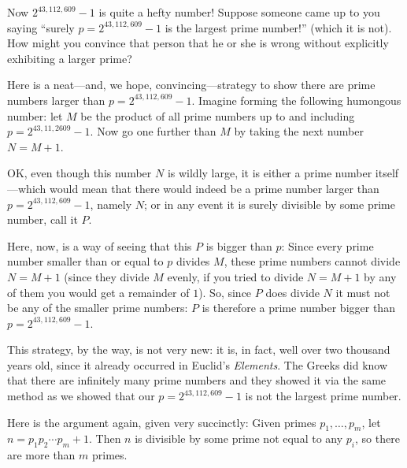 \documentclass[openany]{book}
\theoremstyle{plain}
\theoremstyle{definition}
\begin{document}
Now $2^{43,112,609}-1$ is quite a hefty number! Suppose someone came
up to you saying ``surely $p = 2^{43,112,609}-1$ is the largest prime
number!'' (which it is not). How might you convince that person that
he or she is wrong without explicitly exhibiting a larger prime?


Here is a neat---and, we hope, convincing---strategy to show there are
prime numbers larger than $p = 2^{43,112,609} - 1$. Imagine
forming the following humongous number: let $M$ be the product of all
prime numbers up to and including $p = 2^{43,11,2609} - 1$.  Now go
one further than $M$ by taking the next number $N=M+1$.


OK, even though this number $N$ is wildly large, it is either a prime
number itself---which would mean that there would indeed be a prime
number larger than $p=2^{43,112,609} - 1$, namely $N$; or in any event it is
surely divisible by some prime number, call it $P$.

Here, now, is a way of seeing that this $P$ is bigger than $p$: Since
every prime number smaller than or equal to $p$ divides $M$, these
prime numbers cannot divide $N= M+1$ (since they divide $M$ evenly, if
you tried to divide $N=M+1$ by any of them you would get a remainder
of $1$).  So, since $P$ does divide $N$ it must not be any of the
smaller prime numbers: $P$ is therefore a prime number bigger than $p=
2^{43,112,609}-1$.

This strategy, by the way, is not very new: it is, in fact, well over
two thousand years old, since it already occurred in Euclid's {\em
  Elements}. The Greeks did know that there are infinitely many prime
numbers and they showed it via the same method as we showed that our
$p = 2^{43,112,609} - 1$ is not the largest prime number.

Here is the argument again, given very succinctly:
Given primes $p_1, \ldots, p_m$, let $n=p_1 p_2 \cdots p_m +
1$.  Then $n$ is divisible by some prime not equal to any $p_i$,
so there are more than $m$ primes.
\end{document}
